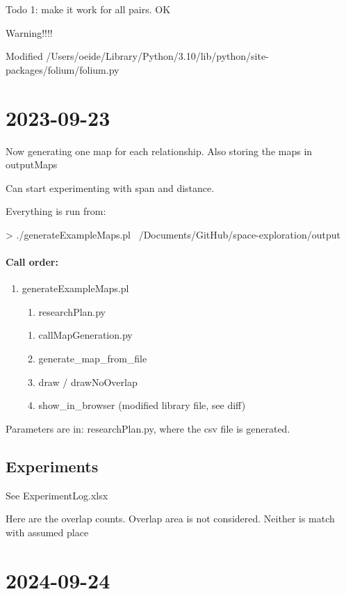 \documentclass[12pt]{book}
\begin{document}
Todo 1: make it work for all pairs. OK

Warning!!!!

Modified /Users/oeide/Library/Python/3.10/lib/python/site-packages/folium/folium.py

\section{2023-09-23}

Now generating one map for each relationship. Also storing the maps in outputMaps

Can start experimenting with span and distance. 

Everything is run from: 

> ./generateExampleMaps.pl ~/Documents/GitHub/space-exploration/output


\paragraph{Call order:}

\begin{enumerate}
\item generateExampleMaps.pl
\begin{enumerate}
\item researchPlan.py
\end{enumerate}
\begin{enumerate}
\item callMapGeneration.py
\item generate\_map\_from\_file
\item draw / drawNoOverlap
\item show\_in\_browser (modified library file, see diff)
\end{enumerate}
\end{enumerate}

Parameters are in: researchPlan.py, where the csv file is generated.

\subsection{Experiments}

See ExperimentLog.xlsx

Here are the overlap counts. Overlap area is not considered. Neither is match with assumed place

\section{2024-09-24}
\end{document}
